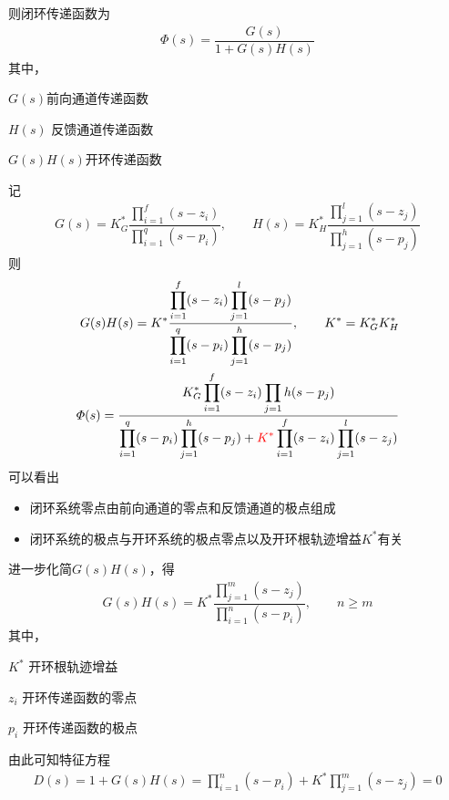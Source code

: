 则闭环传递函数为
\begin{align}
	\varPhi (s) = \dfrac{G(s)}{1 + G(s)H(s)}
\end{align}
其中，
\begin{myitemize}
	\item $G(s)$\quad 前向通道传递函数\vspace*{-0.5em}
	\item $H(s)$ \quad 反馈通道传递函数\vspace*{-0.5em}
	\item $G(s)H(s)$\quad 开环传递函数\vspace*{0.3em}
\end{myitemize}
记
\begin{align*}
	G(s) = K^*_G\dfrac{\displaystyle \prod_{i = 1}^{f}(s - z_i)}{\displaystyle \prod_{i = 1}^q (s - p_i)},\quad \quad 
	H(s) = K^*_H\dfrac{\displaystyle \prod_{j = 1}^{l}(s - z_j)}{\displaystyle \prod_{j = 1}^h (s - p_j)}
\end{align*}
则
\begin{align}
	G(s)H(s) = K^*\dfrac{\displaystyle \prod_{i = 1}^{f}(s - z_i)\prod_{j = 1}^l (s - p_j)}{\displaystyle \prod_{i = 1}^q (s - p_i)\prod_{j = 1}^h (s - p_j)}, \quad \quad K^* = K_G^* K_H^*\\
	\varPhi(s) = \dfrac{\displaystyle K_G^*\prod_{i = 1}^{f}(s - z_i)\prod_{j = 1}{h}(s - p_j) }{\displaystyle \prod_{i = 1}^{q}(s - p_i) \prod_{j = 1}^{h} (s- p_j) + \textcolor{red}{K^*} \prod_{i = 1}^f(s - z_i) \prod_{j = 1}^l(s - z_j) } 
\end{align}
可以看出
\begin{itemize}
	\item 闭环系统零点由前向通道的零点和反馈通道的极点组成\vspace*{-0.5em}
	\item 闭环系统的极点与开环系统的极点零点以及开环根轨迹增益$K^*$有关
\end{itemize}
进一步化简$G(s)H(s)$，得
\begin{align}
	G(s)H(s) = K^*\dfrac{\displaystyle \prod_{j = 1}^{m}(s - z_j)}{\displaystyle \prod_{i = 1}^n (s - p_i)},\quad\quad n \ge m
	\label{GH}
\end{align}
其中，
\begin{myitemize}
	\item $K^*$ \quad 开环根轨迹增益\vspace*{-0.75em}
	\item $z_i\,\,$\quad 开环传递函数的零点\vspace*{-0.75em}
	\item $p_i$ \quad 开环传递函数的极点\vspace*{0.3em}
\end{myitemize}
\noindent 由此可知特征方程
\begin{align}
	D(s) =1 + G(s)H(s) = \prod_{i = 1}^n (s - p_i) + K^* \prod_{j = 1}^{m}(s - z_j) = 0
\end{align}


